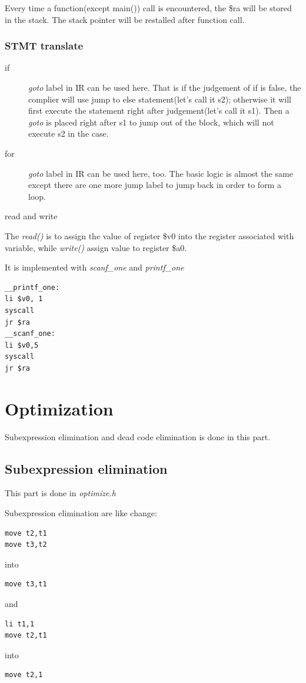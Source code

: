 \documentclass{article}
\begin{document}
Every time a function(except main()) call is encountered, the \$ra will be stored in the stack. The stack pointer will be restalled after function call. 

\subsubsection{STMT translate}

\begin{description}
\item[if] \textit{goto} label in IR can be used here. That is if the judgement of if is false, the complier will use jump to else statement(let's call it s2); otherwise it will first execute the statement right after judgement(let's call it s1). Then a \textit{goto} is placed right after s1 to jump out of the block, which will not execute s2 in the case.

\item[for] \textit{goto} label in IR can be used here, too. The basic logic is almost the same except there are one more jump label to jump back in order to form a loop. 
 
\item[read and write]
\end{description} The \textit{read()} is to assign the value of register \$v0 into the register associated with variable, while \textit{write()} assign value to register \$a0. 

It is implemented with \textit{scanf\_one} and \textit{printf\_one}

\begin{lstlisting} 
__printf_one:
li $v0, 1
syscall
jr $ra
__scanf_one:
li $v0,5
syscall
jr $ra
\end{lstlisting}




\section{Optimization}
Subexpression elimination and dead code elimination is done in this part. 
\subsection{Subexpression elimination}
This part is done in \textit{optimize.h}

Subexpression elimination are like change:
\begin{lstlisting} 
move t2,t1
move t3,t2
\end{lstlisting}
into
\begin{lstlisting} 
move t3,t1
\end{lstlisting}
and
\begin{lstlisting} 
li t1,1
move t2,t1
\end{lstlisting}
into
\begin{lstlisting} 
move t2,1
\end{lstlisting}
\end{document}
